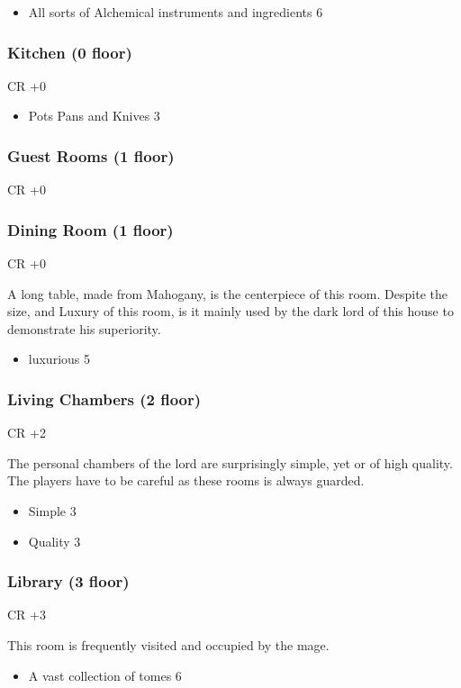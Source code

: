 \documentclass[11pt]{article}
\begin{document}
{\begin{itemize}
\item All sorts of Alchemical instruments and ingredients 6
\end{itemize}
\subsubsection{Kitchen (0 floor)}
\label{sec:org5de4f75}
CR +0

\begin{itemize}
\item Pots Pans and Knives 3
\end{itemize}
\subsubsection{Guest Rooms (1 floor)}
\label{sec:org8f32a40}
CR +0
\subsubsection{Dining Room (1 floor)}
\label{sec:org363e3bd}
CR +0

A long table, made from Mahogany, is the centerpiece of this room. Despite the size, and Luxury of this room, is it mainly used by the dark lord of this house to demonstrate his superiority.

\begin{itemize}
\item luxurious 5
\end{itemize}
\subsubsection{Living Chambers (2 floor)}
\label{sec:org254ed5b}
CR +2

The personal chambers of the lord are surprisingly simple, yet or of high quality. The players have to be careful as these rooms is always guarded. 

\begin{itemize}
\item Simple 3
\item Quality 3
\end{itemize}
\subsubsection{Library (3 floor)}
\label{sec:org2c40f9b}
CR +3

This room is frequently visited and occupied by the mage.

\begin{itemize}
\item A vast collection of tomes 6
\end{itemize}
}
\end{document}
